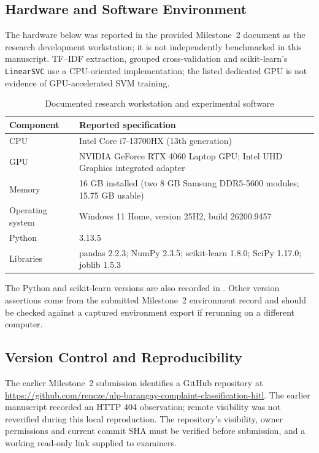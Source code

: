 \subsection{Hardware and Software Environment}
The hardware below was reported in the provided Milestone~2 document as the research development workstation; it is not independently benchmarked in this manuscript. TF--IDF extraction, grouped cross-validation and scikit-learn's \texttt{LinearSVC} use a CPU-oriented implementation; the listed dedicated GPU is not evidence of GPU-accelerated SVM training.
\begin{table}[H]\centering\caption{Documented research workstation and experimental software}\label{tab:m2env}\small\begin{tabularx}{\textwidth}{p{}X}\toprule
Component & Reported specification\\\midrule
CPU & Intel Core i7-13700HX (13th generation)\\
GPU & NVIDIA GeForce RTX 4060 Laptop GPU; Intel UHD Graphics integrated adapter\\
Memory & 16 GB installed (two 8 GB Samsung DDR5-5600 modules; 15.75 GB usable)\\
Operating system & Windows 11 Home, version 25H2, build 26200.9457\\
Python & 3.13.5\\
Libraries & pandas 2.2.3; NumPy 2.3.5; scikit-learn 1.8.0; SciPy 1.17.0; joblib 1.5.3\\\bottomrule
\end{tabularx}\end{table}
The Python and scikit-learn versions are also recorded in . Other version assertions come from the submitted Milestone~2 environment record and should be checked against a captured environment export if rerunning on a different computer.

\subsection{Version Control and Reproducibility}
The earlier Milestone~2 submission identifies a GitHub repository at \url{https://github.com/rencze/nlp-barangay-complaint-classification-hitl}. The earlier manuscript recorded an HTTP 404 observation; remote visibility was not reverified during this local reproduction. The repository's visibility, owner permissions and current commit SHA must be verified before submission, and a working read-only link supplied to examiners.

